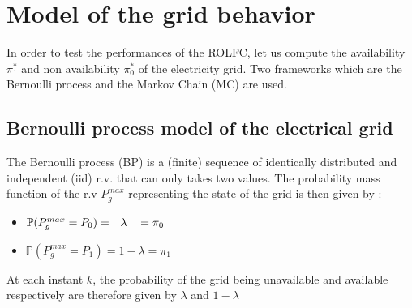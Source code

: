 \documentclass[conference]{IEEEtran}
\begin{document}
\section {Model of the grid behavior}\label{ModelGriBeh}
In order to test the performances of the ROLFC, let us compute the availability $\pi_1^*$ and non availability $\pi_0^*$ of the electricity grid. Two frameworks which are the Bernoulli process  and the Markov Chain (MC)\cite{RBiRna1992} are used. 
 \subsection{Bernoulli process model of the electrical grid}
 The Bernoulli process (BP) is a (finite) sequence of identically distributed and independent (iid) r.v. that can only takes two values. The probability mass function of the r.v  $P_g^{max}$ representing the state of the  grid is then given by :
 \begin{itemize}
    \item $\mathbb{P}(P_g^{max} = P_0) = \hspace{7px}\lambda \hspace{9px} = \pi_0 $
    \item $\mathbb{P}(P_g^{max} = P_1)= 1-\lambda= \pi_1$ 
\end{itemize}
At each instant $k$, the probability of the grid being unavailable and available respectively are therefore given by $\lambda$ and $ 1-\lambda$
\end{document}
